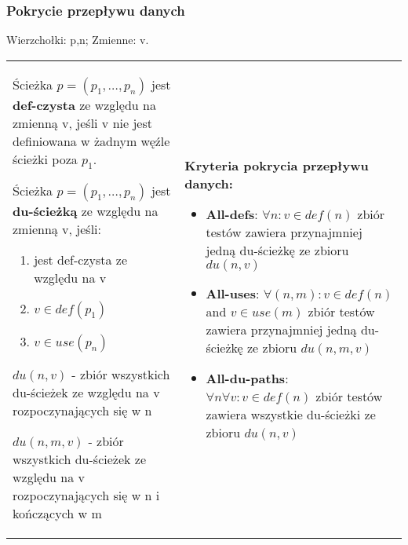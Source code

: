 \documentclass[../main.tex]{subfiles}
\begin{document}
    \subsubsection{Pokrycie przepływu danych}
    Wierzchołki: p,n; Zmienne: v.
    \begin{table}[H]
        \begin{center}
            \begin{tabular}{p{8cm} p{8cm}}
                Ścieżka $p = (p_1 , \dots, p_n)$ jest \textbf{def-czysta} ze względu na zmienną v, jeśli v nie jest
                definiowana w żadnym węźle ścieżki poza $p_1$.

                Ścieżka $p = (p_1 , \dots, p_n)$ jest \textbf{du-ścieżką} ze względu na zmienną v, jeśli:
                \begin{enumerate}
                    \item jest def-czysta ze względu na v
                    \item $v \in def(p_1)$
                    \item $v \in use(p_n)$
                \end{enumerate}

                $du(n, v)$ - zbiór wszystkich du-ścieżek ze względu na v rozpoczynających się w n

                $du(n, m, v)$ - zbiór wszystkich du-ścieżek ze względu na v rozpoczynających się w n i kończących w m
                &
                \textbf{Kryteria pokrycia przepływu danych:}
                \begin{itemize}
                    \item \textbf{All-defs}: $\forall n : v \in def(n)$
                    zbiór testów zawiera przynajmniej jedną du-ścieżkę ze zbioru $du(n, v)$
                    \item \textbf{All-uses}: $\forall (n, m) : v \in def(n)$ and $v \in use(m)$ zbiór testów zawiera przynajmniej jedną
                    du-ścieżkę ze zbioru $du(n, m, v)$
                    \item \textbf{All-du-paths}: $\forall n \forall v: v \in def(n)$
                    zbiór testów zawiera wszystkie du-ścieżki ze zbioru $du(n, v)$
                \end{itemize}\\
            \end{tabular}
        \end{center}
    \end{table}
\end{document}

